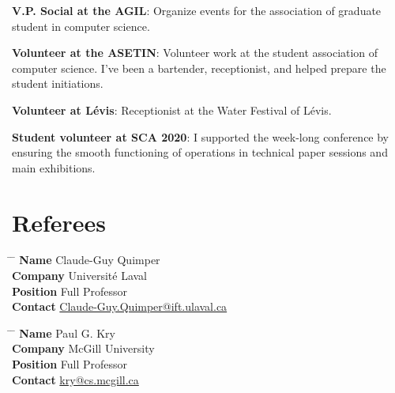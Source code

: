 \documentclass[10pt]{article} %
\begin{document}
\textbf{V.P. Social at the AGIL}: Organize events for the association of graduate student in computer science.

\textbf{Volunteer at the ASETIN}: Volunteer work at the student association of computer science. I've been a bartender, receptionist, and helped prepare the student initiations.

\textbf{Volunteer at Lévis}: Receptionist at the Water Festival of Lévis.

\textbf{Student volunteer at SCA 2020}: I supported the week-­long conference by ensuring the smooth functioning of operations in technical paper sessions and main exhibitions.

\section{Referees}

\parbox{0.5\textwidth}{ 
\begin{tabbing}
\hspace{2.75cm} \= \hspace{4cm} \= \kill 
{\bf Name} \> Claude-Guy Quimper \\ 
{\bf Company} \> Université Laval \\ 
{\bf Position} \> Full Professor \\  
{\bf Contact} \> \href{mailto:Claude-Guy.Quimper@ift.ulaval.ca}{Claude-Guy.Quimper@ift.ulaval.ca} 
\end{tabbing}}
\hfill 
\parbox{0.5\textwidth}{
\begin{tabbing}
\hspace{2.75cm} \= \hspace{4cm} \= \kill
{\bf Name} \> Paul G. Kry\\ 
{\bf Company} \> McGill University\\ 
{\bf Position} \> Full Professor \\ 
{\bf Contact} \> \href{mailto:kry@cs.mcgill.ca}{kry@cs.mcgill.ca}
\end{tabbing}}

\end{document}
